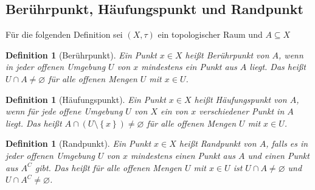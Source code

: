 \documentclass[11pt, twoside, a4paper]{article}
\theoremstyle{plain}
\newtheorem{definition}[blockelement]{Definition}
\numberwithin{equation}{subsection}
\newcommand{\set}[1]{\left\{#1\right\}}
\newcommand{\pair}[1]{\left(#1\right)}
\newcommand{\exclude}[0]{\setminus}
\renewcommand{\emptyset}{\varnothing}
\begin{document}
    \subsection{Berührpunkt, Häufungspunkt und Randpunkt}

    Für die folgenden Definition sei $\pair{X, \tau}$ ein topologischer Raum und $A\subseteq X$

    \begin{definition}[Berührpunkt]
        Ein Punkt $x\in X$ heißt Berührpunkt von $A$, wenn in jeder offenen Umgebung $U$ von $x$ mindestens ein Punkt aus $A$ liegt. Das heißt $U\cap A \neq \emptyset$ für alle offenen Mengen $U$ mit $x\in U$.
    \end{definition}

    \begin{definition}[Häufungspunkt]
        Ein Punkt $x\in X$ heißt Häufungspunkt von $A$, wenn für jede offene Umgebung $U$ von $X$ ein von $x$ verschiedener Punkt in $A$ liegt. Das heißt $A\cap \pair{U\exclude\set{x}} \neq \emptyset$ für alle offenen Mengen $U$ mit $x\in U$.
    \end{definition}

    \begin{definition}[Randpunkt]
        Ein Punkt $x\in X$ heißt Randpunkt von $A$, falls es in jeder offenen Umgebung $U$ von $x$ mindestens einen Punkt aus $A$ und einen Punkt aus $A^{C}$ gibt. Das heißt für alle offenen Mengen $U$ mit $x\in U$ ist $U\cap A \neq \emptyset$ und $U\cap A^{C} \neq \emptyset$.
    \end{definition}
\end{document}
